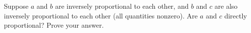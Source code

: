 Suppose $a$ and $b$ are inversely proportional to each other, and $b$ and $c$ are also inversely proportional to each other (all quantities nonzero). Are $a$ and $c$ directly proportional? Prove your answer.
